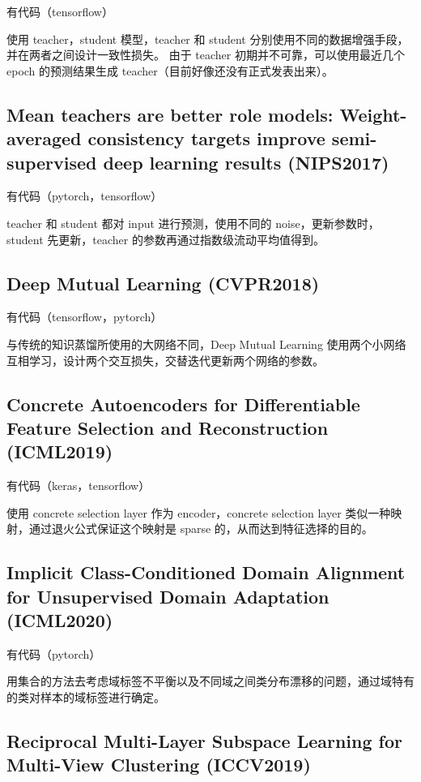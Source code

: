 \documentclass[UTF8]{ctexart}
\begin{document}
有代码（tensorflow）

使用 teacher，student 模型，teacher 和 student 分别使用不同的数据增强手段，并在两者之间设计一致性损失。
由于 teacher 初期并不可靠，可以使用最近几个 epoch 的预测结果生成 teacher（目前好像还没有正式发表出来）。

\subsection{Mean teachers are better role models: Weight-averaged consistency targets improve semi-supervised deep learning results (NIPS2017)}

有代码（pytorch，tensorflow）

teacher 和 student 都对 input 进行预测，使用不同的 noise，更新参数时，student 先更新，teacher 的参数再通过指数级流动平均值得到。

\subsection{Deep Mutual Learning (CVPR2018)}

有代码（tensorflow，pytorch）

与传统的知识蒸馏所使用的大网络不同，Deep Mutual Learning 使用两个小网络互相学习，设计两个交互损失，交替迭代更新两个网络的参数。

\subsection{Concrete Autoencoders for Differentiable Feature Selection and Reconstruction (ICML2019)}

有代码（keras，tensorflow）

使用 concrete selection layer 作为 encoder，concrete selection layer 类似一种映射，通过退火公式保证这个映射是 sparse 的，从而达到特征选择的目的。

\subsection{Implicit Class-Conditioned Domain Alignment for Unsupervised Domain Adaptation (ICML2020)}

有代码（pytorch）

用集合的方法去考虑域标签不平衡以及不同域之间类分布漂移的问题，通过域特有的类对样本的域标签进行确定。

\subsection{Reciprocal Multi-Layer Subspace Learning for Multi-View Clustering (ICCV2019)}
\end{document}
